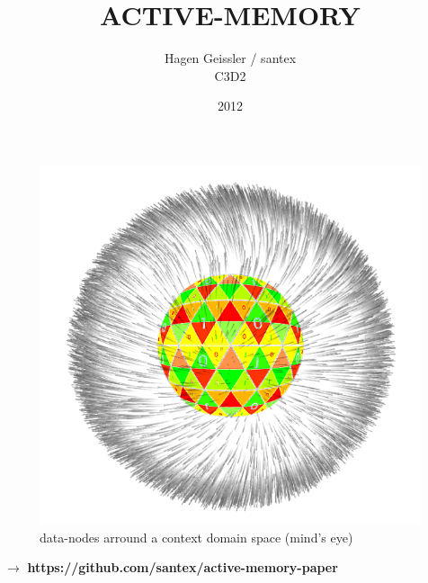 \documentclass[15pt]{article}
\begin{document}
\vskip 1cm

\begin{figure}[htp]
\includegraphics[scale=0.70]{./img/artee-1.png}
\caption{data-nodes arround a context domain space (mind's eye)}

\end{figure}


\title{\textbf{ACTIVE-MEMORY}}
\author{Hagen Geissler / santex\\
		C3D2}
\date{2012}


\maketitle


$\rightarrow$ \textbf{https://github.com/santex/active-memory-paper}
\end{document}

